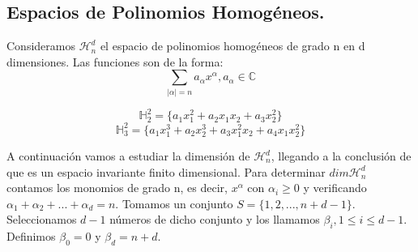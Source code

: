 \subsection{Espacios de Polinomios Homogéneos.}
Consideramos $\mathcal{H}^d_n$ el espacio de polinomios homogéneos de grado n en d dimensiones. Las funciones son de la forma:
$$
\sum_{|\alpha|=n}a_\alpha x^\alpha, a_\alpha \in \mathds{C}
$$
\begin{example}
	$$
		\mathds{H}^2_2 = \{ a_1x_1^2 + a_2x_1x_2 + a_3x_2^2\} 
   $$
$$		\mathds{H}^2_3 = \{ a_1x_1^3 + a_2x_2^3 + a_3x_1^2x_2 + a_4x_1x_2^2 \}
	$$
\end{example}
\medskip
A continuación vamos a estudiar la dimensión de  $\mathcal{H}^d_n$, llegando a la conclusión de que es un espacio invariante finito dimensional.
Para determinar $dim \mathcal{H}^d_n$ contamos los monomios de grado n, es decir, $x^\alpha$ con $\alpha_i \ge 0$ y verificando $\alpha_1 + \alpha_2 + ... + \alpha_d = n$. Tomamos un conjunto $S=\{1,2,...,n+d-1\}$. Seleccionamos $d-1$ números de dicho conjunto y los llamamos $\beta_i, 1\leq i \leq d-1$. Definimos  $\beta_0 = 0 $ y $\beta_d = n+d$.

